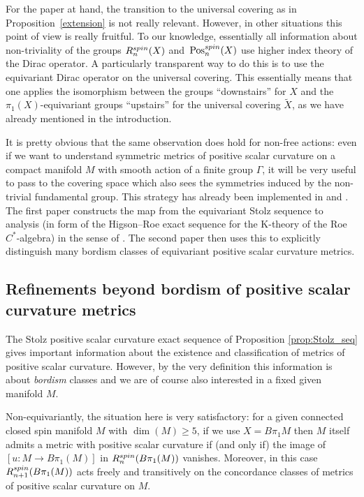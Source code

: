 \documentclass[11pt]{article}
\numberwithin{equation}{section}
\numberwithin{equation}{section}
\begin{document}
	\begin{Remark}
		For the paper at hand, the transition to the universal covering as in
		Proposition~\ref{extension} is not really relevant. However, in other
		situations this point of view is really fruitful. To our knowledge,
		essentially all information about non-triviality of the groups
		$R^{\rm spin}_n(X)$ and~$\mathrm{Pos}_n^{\rm spin}(X)$ use higher index theory of the Dirac
		operator. A particularly transparent way to do this is to use the
		equivariant Dirac operator on the universal covering. This essentially means
		that one applies the isomorphism between the groups ``downstairs'' for $X$ and the
		$\pi_1(X)$-equivariant groups ``upstairs'' for the universal covering
		$\tilde X$, as we have already mentioned in the introduction.
		
		It
		is pretty obvious that the same observation does hold for non-free actions: even
		if we want to understand symmetric metrics of positive scalar curvature on a
		compact manifold $M$ with smooth action of a finite group $\Gamma$, it will
		be very useful to pass to the covering space which also sees the symmetries
		induced by the non-trivial fundamental group. This strategy has already been
		implemented in \cite[Section 5]{XieYu}
		and \cite{XieYuZeidler}. The first paper constructs the map from the
		equivariant
		Stolz sequence to analysis (in form of the Higson--Roe exact sequence for the
		K-theory of the Roe $C^*$-algebra) in the
		sense of \cite{PiazzaSchick}. The second paper then uses this to explicitly
		distinguish many bordism classes of equivariant positive scalar curvature
		metrics.
	\end{Remark}
	
	
	\subsection{Refinements beyond bordism of positive scalar curvature metrics}
	
	The Stolz positive scalar curvature exact sequence of Proposition
	\ref{prop:Stolz_seq} gives important information about the existence and
	classification of metrics of positive scalar curvature. However, by the very
	definition this information is about \emph{bordism} classes and we are of
	course also interested in a fixed given manifold $M$.
	
	Non-equivariantly, the situation here is very satisfactory: for a given
	connected closed spin manifold $M$ with $\dim(M)\ge 5$, if we use $X=B\pi_1M$
	then $M$ itself admits a metric with positive scalar curvature if (and only
	if) the image of $[u\colon M\to B\pi_1(M)]$ in $R_n^{\rm spin}(B\pi_1(M))$
	vanishes. Moreover, in this case $R_{n+1}^{\rm spin}(B\pi_1(M))$ acts freely and
	transitively on the concordance classes of metrics of positive scalar
	curvature on $M$.
	
\end{document}
